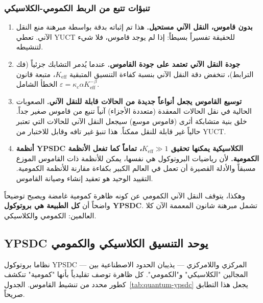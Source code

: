 \documentclass[12pt,a4paper]{article}
\theoremstyle{remark}
\begin{document}
	\subsubsection*{تنبؤات تتبع من الربط الكمومي-الكلاسيكي}
	
	\begin{enumerate}
		\item \textbf{بدون قاموس، النقل الآني مستحيل.} هذا تم إثباته بدقة بواسطة مبرهنة منع النقل الآني. تعطي YUCT للحقيقة تفسيراً بسيطاً: إذا لم يوجد قاموس، فلا شيء لتنشيطه.
		\item \textbf{جودة النقل الآني تعتمد على جودة القاموس.} عندما يُدمر التشابك جزئياً (فك الترابط)، تنخفض دقة النقل الآني بنسبة كفاءة التنسيق المتبقية \( K_{\mathrm{eff}} \)، متبعة قانون الخطأ الشامل \( \varepsilon = \kappa_c \alpha K_{\mathrm{eff}}^{-\beta} \).
		\item \textbf{توسيع القاموس يجعل أنواعاً جديدة من الحالات قابلة للنقل الآني.} الصعوبات الحالية في نقل الحالات المعقدة (متعددة الأجزاء) آنياً تنبع من قاموس صغير جداً. خلق بنية متشابكة أثرى (قاموس موسع) سيجعل النقل الآني للحالات التي تعتبر حالياً غير قابلة للنقل ممكناً. هذا تنبؤ غير تافه وقابل للاختبار من YUCT.
		\item \textbf{أنظمة YPSDC الكلاسيكية يمكنها تحقيق \( K_{\mathrm{eff}} \gg 1 \)، تماماً كما تفعل الأنظمة الكمومية.} لأن رياضيات البروتوكول هي نفسها، يمكن للأنظمة ذات القاموس الموزع مسبقاً والأدلة القصيرة أن تعمل في العالم الكبير بكفاءة مقارنة للأنظمة الكمومية. التقييد الوحيد هو تعقيد إنشاء وصيانة القاموس.
	\end{enumerate}
	
	وهكذا، يتوقف النقل الآني الكمومي عن كونه ظاهرة كمومية غامضة ويصبح توضيحاً واضحاً أن \textbf{كل الطبيعة هي بروتوكول YPSDC}. تشمل مبرهنة شانون المعممة الآن كلا العالمين: الكمومي والكلاسيكي.
	
	\subsection{YPSDC يوحد التنسيق الكلاسيكي والكمومي}
	\label{subsec:unified-table}
	
	نظاما بروتوكول YPSDC — المركزي واللامركزي — يذيبان الحدود الاصطناعية بين المجالين "الكلاسيكي" و"الكمومي". كل ظاهرة توصف تقليدياً بأنها "كمومية" تنكشف كطور محدد من تنشيط القاموس. الجدول~\ref{tab:quantum-ypsdc} يجعل هذا التطابق صريحاً.
	
\end{document}
